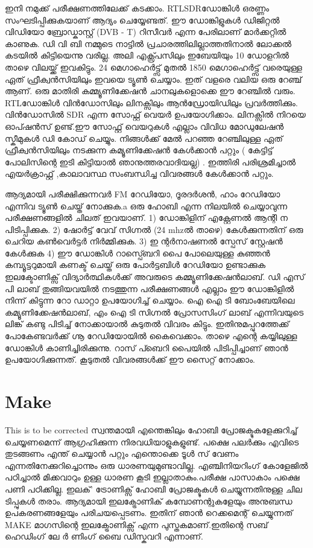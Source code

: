 \documentclass[10pt,a4paper]{report}
\begin{document}
    ഇനി നമുക്ക്‌ പരീക്ഷണത്തിലേക്ക് കടക്കാം. RTLSDRഡോങ്കിൾ ഒരണ്ണം സംഘടിപ്പിക്കുകയാണ് ആദ്യം ചെയ്യേണ്ടത്. ഈ ഡോങ്കിളുകൾ ഡിജിറ്റൽ വിഡിയോ ബ്രോഡ്കാസ്റ്റ് (DVB - T) റിസീവർ എന്ന പേരിലാണ് മാർക്കറ്റിൽ കാണുക. ഡി വി ബി നമ്മുടെ നാട്ടിൽ പ്രചാരത്തിലില്ലാത്തതിനാൽ ലോക്കൽ കടയിൽ കിട്ടിയെന്നു വരില്ല. അലി എക്സ്പ്രസിലും ഇബേയിയും 10 ഡോളറിൽ താഴെ വിലയ്ക്ക് ഇവകിട്ടും. 24 മെഗാഹെർട്ട്സ് മുതൽ 1850 മെഗാഹെർട്ട്സ് വരെയുള്ള ഏത് ഫ്രീക്വൻസിയിലും ഇവയെ ട്യൂൺ ചെയ്യാം. ഇത് വളരെ വലിയ ഒരു റേഞ്ച് ആണ്. ഒരു മാതിരി കമ്മ്യൂണിക്കേഷൻ ചാനലുകളൊക്കെ ഈ റേഞ്ചിൽ വരും. RTLഡോങ്കിൾ വിൻഡോസിലും ലിനക്സിലും ആൻഡ്രോയിഡിലും പ്രവർത്തിക്കും. വിൻഡോസിൽ SDR  എന്ന സോഫ്റ്റ് വെയർ ഉപയോഗിക്കാം. ലിനക്സിൽ നിറയെ ഓപ്ഷൻസ് ഉണ്ട്.ഈ സോഫ്റ്റ് വെയറുകൾ എല്ലാം വിവിധ മോഡുലേഷൻ സ്കീമുകൾ ഡി കോഡ് ചെയ്യും. നിങ്ങൾക്ക് മേൽ പറഞ്ഞ റേഞ്ചിലുള്ള ഏത് ഫ്രീക്വൻസിയിലും നടക്കുന്ന കമ്യൂണിക്കേഷൻ കേൾക്കാൻ പറ്റും ( കേട്ടിട്ട് പോലിസിന്റെ ഇടി കിട്ടിയാൽ ഞാനുത്തരവാദിയല്ല) . ഇത്തിരി പരിശ്രമിച്ചാൽ എയർക്രാഫ്റ്റ് ,കാലാവസ്ഥ സംബന്ധിച്ച വിവരങ്ങൾ കേൾക്കാൻ പറ്റും.
    
     ആദ്യമായി പരീക്ഷിക്കുന്നവർ FM റേഡിയോ, ദൂരദർശൻ, ഹാം റേഡിയോ എന്നിവ ട്യൂൺ ചെയ്ത് നോക്കുക.a ഒരു ഹോബി എന്ന നിലയിൽ ചെയ്യാവുന്ന പരീക്ഷണങ്ങളിൽ ചിലത് ഇവയാണ്. 1) ഡോങ്കിളിന് എക്റ്റേണൽ ആന്റി ന പിടിപ്പിക്കുക. 2) ഷോർട്ട് വേവ് സിഗ്നൽ (24 mhzൽ താഴെ) കേൾക്കുന്നതിന് ഒരു ചെറിയ കൺവെർട്ടർ നിർമ്മിക്കുക. 3) ഇ ന്റർനാഷണൽ സ്പേസ് സ്റ്റേഷൻ കേൾക്കുക 4) ഈ ഡോങ്കിൾ റാസ്പ്ബെറി പൈ പോലെയുള്ള കുഞ്ഞൻ കമ്പ്യൂട്ടറുമായി കണക്ട് ചെയ്ത് ഒരു പോർട്ടബിൾ റേഡിയോ ഉണ്ടാക്കുക ഇലക്ടോണിക്സ് വിദ്യാർത്ഥികൾക്ക് അവരുടെ കമ്മ്യൂണിക്കേഷൻലാബ്. ഡി എസ് പി ലാബ് തുങ്ങിയവയിൽ നടത്തുന്ന പരീക്ഷണങ്ങൾ എല്ലാം ഈ ഡോങ്കിളിൽ നിന്ന് കിട്ടുന്ന റോ ഡാറ്റാ ഉപയോഗിച്ച് ചെയ്യാം. ഐ ഐ ടി ബോംബേയിലെ കമ്യൂണിക്കേഷൻലാബ്, എം ഐ ടി സിഗ്നൽ പ്രോസസിംഗ് ലാബ് എന്നിവയുടെ ലിങ്ക് കണ്ടു പിടിച്ച് നോക്കായാൽ കുടുതൽ വിവരം കിട്ടും. ഇതിനുമപ്പുറത്തേക്ക് പോകേണ്ടവർക്ക് ഗ്നൂ റേഡിയോയിൽ കൈവെക്കാം.  താഴെ എന്റെ കയ്യിലുള്ള ഡോങ്കിൾ കാണിച്ചിരിക്കുന്നു. റാസ് പ്ബെറി പൈയിൽ പിടിപ്പിച്ചാണ് ഞാൻ ഉപയോഗിക്കുന്നത്. കൂടുതൽ വിവരങ്ങൾക്ക് ഈ സൈറ്റ് നോക്കാം.
    
     \section{ Make}
    This is to be corrected
     സ്വന്തമായി എന്തെങ്കിലും  ഹോബി പ്രോജക്ടുകളേക്കുറിച്ച് ചെയ്യണമെന്ന് ആഗ്രഹിക്കുന്ന നിരവധിയാളുകളുണ്ട്. പക്ഷെ പലർക്കും എവിടെ തുടങ്ങണം എന്ത് ചെയ്യാൻ പറ്റും എന്തൊക്കെ ടൂൾ സ് വേണം എന്നതിനേക്കുറിച്ചൊന്നും ഒരു ധാരണയുമുണ്ടാവില്ല. എഞ്ചിനിയറിംഗ് കോളേജിൽ പഠിച്ചാൽ മിക്കവാറും ഉള്ള ധാരണ കൂടി ഇല്ലാതാകും.പരീക്ഷ പാസാകാം പക്ഷെ പണി പഠിക്കില്ല. ഇലക്' ട്രോണിക്സ് ഹോബി പ്രോജക്ടുകൾ ചെയ്യുന്നതിനുള്ള ചില ടിപ്പുകൾ തരാം. ആദ്യമായി ഇലക്ട്രോണിക് കമ്പോണന്റുകളേയും അനുബന്ധ ഉപകരണങ്ങളേയും പരിചയപ്പെടണം. ഇതിന് ഞാൻ റെക്കമെന്റ് ചെയ്യുന്നത് MAKE മാഗസിന്റെ ഇലക്ട്രോണിക്സ് എന്ന പുസ്തകമാണ്.ഇതിന്റെ സബ് ഹെഡിംഗ്‌ ലേ ർ ണിംഗ്‌ ബൈ ഡിസ്കവറി എന്നാണ്.
     
\end{document}
